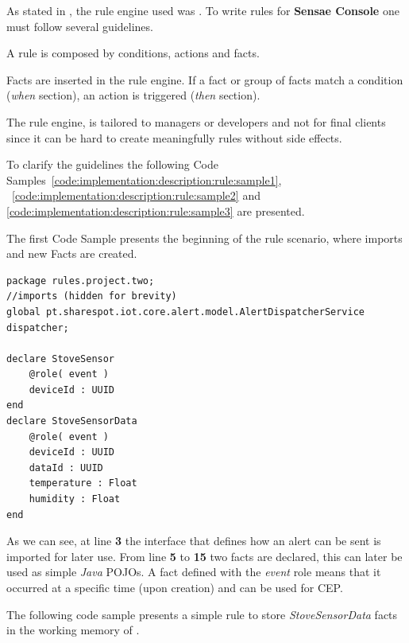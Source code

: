 As stated in , the rule engine used was . To write rules for \textbf{Sensae Console} one must follow several guidelines.

A  rule is composed by conditions, actions and facts.

Facts are inserted in the rule engine. If a fact or group of facts match a condition (\textit{when} section), an action is triggered (\textit{then} section).

The rule engine, is tailored to managers or developers and not for final clients since it can be hard to create meaningfully rules without side effects.

To clarify the guidelines the following Code Samples~\ref{code:implementation:description:rule:sample1}, ~\ref{code:implementation:description:rule:sample2} and \ref{code:implementation:description:rule:sample3} are presented.

The first Code Sample presents the beginning of the rule scenario, where imports and new Facts are created.

\begin{lstlisting}[style=drools, caption=Rule Scenario Example - Part 1, label={code:implementation:description:rule:sample1}]
package rules.project.two;
//imports (hidden for brevity)
global pt.sharespot.iot.core.alert.model.AlertDispatcherService dispatcher;

declare StoveSensor
    @role( event )
    deviceId : UUID
end
declare StoveSensorData
    @role( event )
    deviceId : UUID
    dataId : UUID
    temperature : Float
    humidity : Float
end
\end{lstlisting}

As we can see, at line \textbf{3} the interface that defines how an alert can be sent is imported for later use.
From line \textbf{5} to \textbf{15} two facts are declared, this can later be used as simple \textit{Java} POJOs. A fact defined with the \textit{event} role means that it occurred at a specific time (upon creation) and can be used for \gls{CEP}.

The following code sample presents a simple rule to store \textit{StoveSensorData} facts in the working memory of .

